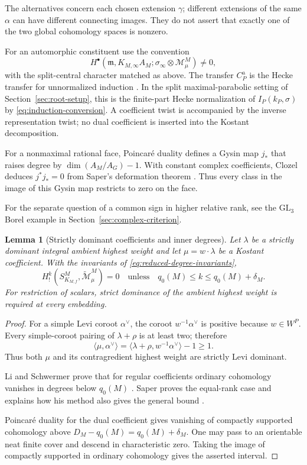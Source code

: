 \documentclass[12pt]{amsart}
\numberwithin{equation}{section}
\theoremstyle{plain}
\newtheorem{lemma}[theorem]{Lemma}
\theoremstyle{definition}
\theoremstyle{remark}
\newcommand{\GL}{\mathrm{GL}}
\newcommand{\cM}{\mathcal M}
\newcommand{\tcM}{\widetilde{\mathcal M}}
\begin{document}
The alternatives concern each chosen extension $\gamma$; different extensions of the same $\alpha$ can have different connecting images. They do not assert that exactly one of the two global cohomology spaces is nonzero.

For an automorphic constituent use the convention
\[
 H^\bullet(\mathfrak m,K_{M,\infty}A_M;
            \sigma_\infty\otimes\cM_\mu^M)\ne0,
\]
with the split-central character matched as above. The transfer $C_P^{\mathrm a}$ is the Hecke transfer for unnormalized induction \cite[\S2]{Clozel2022}. In the split maximal-parabolic setting of Section~\ref{sec:root-setup}, this is the finite-part Hecke normalization of $I_P(k_P,\sigma)$ by \eqref{eq:induction-conversion}. A coefficient twist is accompanied by the inverse representation twist; no dual coefficient is inserted into the Kostant decomposition.

For a nonmaximal rational face, Poincar\'e duality defines a Gysin map $j_*$ that raises degree by $\dim(A_M/A_G)-1$. With constant complex coefficients, Clozel deduces $j^*j_*=0$ from Saper's deformation theorem \cite[\S5.1, Prop.~5.1, Thm.~5.2]{Clozel2022}. Thus every class in the image of this Gysin map restricts to zero on the face.

For the separate question of a common sign in higher relative rank, see the $\GL_3$ Borel example in Section~\ref{sec:complex-criterion}.

\begin{lemma}[Strictly dominant coefficients and inner degrees] \label{lem:regular-inner-degrees} 
Let $\lambda$ be a strictly dominant integral ambient highest weight and let $\mu=w\cdot\lambda$ be a Kostant coefficient. With the invariants of \eqref{eq:reduced-degree-invariants},
\[
 H_!^k(S^M_{K_{M,f}},\tcM_\mu^M)=0
 \quad\text{unless}\quad
 q_0(M)\le k\le q_0(M)+\delta_M.
\]
For restriction of scalars, strict dominance of the ambient highest weight is required at every embedding.
\end{lemma}

\begin{proof}
For a simple Levi coroot $\alpha^\vee$, the coroot $w^{-1}\alpha^\vee$ is positive because $w\in W^P$. Every simple-coroot pairing of $\lambda+\rho$ is at least two; therefore
\[
 \langle\mu,\alpha^\vee\rangle
 =\langle\lambda+\rho,w^{-1}\alpha^\vee\rangle-1\ge1.
\]
Thus both $\mu$ and its contragredient highest weight are strictly Levi dominant.

Li and Schwermer prove that for regular coefficients ordinary cohomology vanishes in degrees below $q_0(M)$ \cite{LiSchwermer2004}. Saper proves the equal-rank case and explains how his method also gives the general bound \cite[Thm.~5 and n.~4, pp.~332--333]{Saper2005}.

Poincar\'e duality for the dual coefficient gives vanishing of compactly supported cohomology above $D_M-q_0(M)=q_0(M)+\delta_M$. One may pass to an orientable neat finite cover and descend in characteristic zero. Taking the image of compactly supported in ordinary cohomology gives the asserted interval. 
\end{proof}
\end{document}
